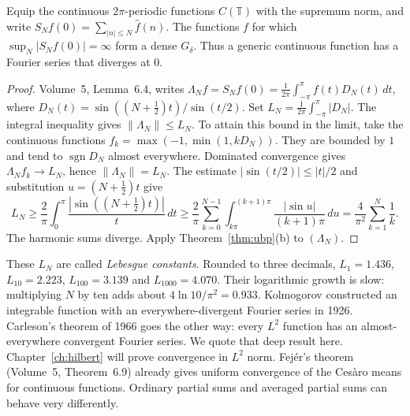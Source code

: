 \begin{theorem}\label{thm:fourierdiverge}
Equip the continuous $2\pi$-periodic functions $C(\mathbb T)$ with the supremum norm, and write $S_Nf(0)=\sum_{|n|\le N}\hat f(n)$. The functions $f$ for which $\sup_N|S_Nf(0)|=\infty$ form a dense $G_\delta$. Thus a generic continuous function has a Fourier series that diverges at $0$.
\end{theorem}
\begin{proof}
Volume~5, Lemma~6.4, writes $\Lambda_Nf=S_Nf(0)=\frac1{2\pi}\int_{-\pi}^{\pi}f(t)D_N(t)\,dt$, where $D_N(t)=\sin((N+\frac12)t)/\sin(t/2)$. Set $L_N=\frac1{2\pi}\int_{-\pi}^{\pi}|D_N|$. The integral inequality gives $\|\Lambda_N\|\le L_N$. To attain this bound in the limit, take the continuous functions $f_k=\max(-1,\min(1,kD_N))$. They are bounded by $1$ and tend to $\operatorname{sgn}D_N$ almost everywhere. Dominated convergence gives $\Lambda_Nf_k\to L_N$, hence $\|\Lambda_N\|=L_N$. The estimate $|\sin(t/2)|\le|t|/2$ and substitution $u=(N+\frac12)t$ give
\[L_N\ge\frac2\pi\int_0^\pi\frac{|\sin((N+\frac12)t)|}t\,dt\ge\frac2\pi\sum_{k=0}^{N-1}\int_{k\pi}^{(k+1)\pi}\frac{|\sin u|}{(k+1)\pi}\,du=\frac4{\pi^2}\sum_{k=1}^N\frac1k.\]
The harmonic sums diverge. Apply Theorem~\ref{thm:ubp}(b) to $(\Lambda_N)$.
\end{proof}

These $L_N$ are called \emph{Lebesgue constants}. Rounded to three decimals, $L_1=1.436$, $L_{10}=2.223$, $L_{100}=3.139$ and $L_{1000}=4.070$. Their logarithmic growth is slow: multiplying $N$ by ten adds about $4\ln10/\pi^2=0.933$. Kolmogorov constructed an integrable function with an everywhere-divergent Fourier series in 1926. Carleson's theorem of 1966 goes the other way: every $L^2$ function has an almost-everywhere convergent Fourier series. We quote that deep result here. Chapter~\ref{ch:hilbert} will prove convergence in $L^2$ norm. Fej\'er's theorem (Volume~5, Theorem~6.9) already gives uniform convergence of the Ces\`aro means for continuous functions. Ordinary partial sums and averaged partial sums can behave very differently.

